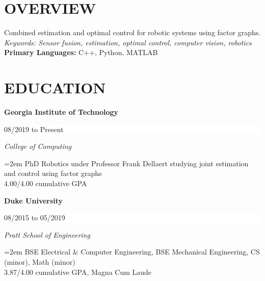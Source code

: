 \documentclass[paper=letter,fontsize=11pt]{scrartcl} %
\newcommand{\sepspace}{\vspace*{0em}}		%
\newcommand{\NewPart}[2]{\section*{\uppercase{#1} #2}}
\newcommand{\EducationEntry}[4]{
		\noindent \textbf{#1} \hfill      %
		\colorbox{White}{%
			\bf 
			\parbox{10em}{%
			\hfill\color{Black}#2}} \par  %
		\noindent \textit{#3} \par        %
		\noindent\hangindent=2em\hangafter=0 \small #4 %
		\normalsize \par}
\begin{document}
 \NewPart{Overview}{}
	Combined estimation and optimal control for robotic systems using factor graphs.\\
 \textit{Keywords: Sensor fusion, estimation, optimal control, computer vision, robotics}
\\ \textbf{Primary Languages:} C++, Python, MATLAB


\NewPart{Education}{}

\EducationEntry{Georgia Institute of Technology}{08/2019 to Present}{College of Computing}{PhD Robotics under Professor Frank Dellaert studying joint estimation and control using factor graphs\\4.00/4.00 cumulative GPA}

\EducationEntry{Duke University}{08/2015 to 05/2019}{Pratt School of Engineering}{BSE Electrical \& Computer Engineering, BSE Mechanical Engineering, CS (minor), Math (minor)\\
3.87/4.00 cumulative GPA, Magna Cum Laude}
\end{document}
